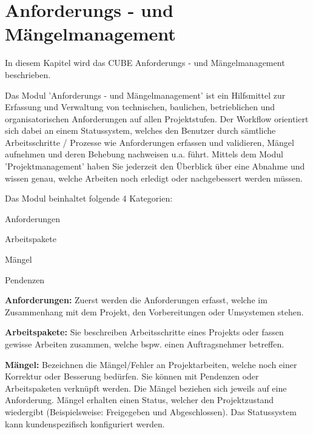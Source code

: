 
\clearpage

\section{Anforderungs - und Mängelmanagement}

In diesem Kapitel wird das CUBE Anforderungs - und Mängelmanagement beschrieben.

\vspace{\baselineskip}

Das Modul 'Anforderungs - und Mängelmanagement' ist ein Hilfsmittel zur Erfassung und Verwaltung von technischen, baulichen, betrieblichen und organisatorischen Anforderungen auf allen Projektstufen. Der Workflow orientiert sich dabei an einem Statussystem, welches den Benutzer durch sämtliche Arbeitsschritte / Prozesse wie Anforderungen erfassen und validieren, Mängel aufnehmen und deren Behebung nachweisen u.a. führt. Mittels dem Modul 'Projektmanagement' haben Sie jederzeit den Überblick über eine Abnahme und wissen genau, welche Arbeiten noch erledigt oder nachgebessert werden müssen.

\vspace{\baselineskip}

Das Modul beinhaltet folgende 4 Kategorien:

\vspace{\baselineskip}

\begin{compactitem}
	\item Anforderungen
	\item Arbeitspakete
	\item Mängel
	\item Pendenzen
\end{compactitem}

\vspace{\baselineskip}

\textbf{Anforderungen:} Zuerst werden die Anforderungen erfasst, welche im Zusammenhang mit dem Projekt, den Vorbereitungen oder Umsystemen stehen.

\textbf{Arbeitspakete:} Sie beschreiben Arbeitsschritte eines Projekts oder fassen gewisse Arbeiten zusammen, welche bspw. einen Auftragsnehmer betreffen.

\textbf{Mängel:} Bezeichnen die Mängel/Fehler an Projektarbeiten, welche noch einer Korrektur oder Besserung bedürfen. Sie können mit Pendenzen oder Arbeitspaketen verknüpft werden. Die Mängel beziehen sich jeweils auf eine Anforderung. Mängel erhalten einen Status, welcher den Projektzustand wiedergibt (Beispielsweise: Freigegeben und Abgeschlossen). Das Statussystem kann kundenspezifisch konfiguriert werden.

